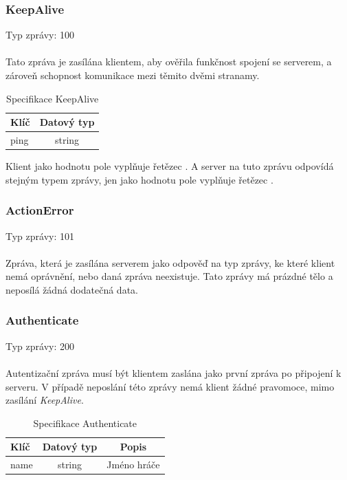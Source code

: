 \documentclass[12pt, a4paper]{article}
\begin{document}
    \subsubsection*{KeepAlive}
    Typ zprávy: 100\\\\
    Tato zpráva je zasílána klientem, aby ověřila funkčnost spojení se serverem, a zároveň schopnost komunikace mezi těmito dvěmi stranamy.

    \begin{table}[H]
        \centering
        \begin{tabular}{|l|c|}
            \hline
            Klíč & Datový typ\\
            \hline
            \hline
            ping & string \\
            \hline
        \end{tabular}
        \caption{Specifikace KeepAlive}
    \end{table}

    Klient jako hodnotu pole  vyplňuje řetězec . A server na tuto zprávu odpovídá stejným typem zprávy, jen jako hodnotu pole  vyplňuje řetězec .

    \subsubsection*{ActionError}
    Typ zprávy: 101\\\\
    Zpráva, která je zasílána serverem jako odpověď na typ zprávy, ke které klient nemá oprávnění, nebo daná zpráva neexistuje.
    Tato zprávy má prázdné tělo a neposílá žádná dodatečná data.

    \subsubsection*{Authenticate}
    Typ zprávy: 200\\\\
    Autentizační zpráva musí být klientem zaslána jako první zpráva po připojení k serveru.
    V případě neposlání této zprávy nemá klient žádné pravomoce, mimo zasílání \textit{KeepAlive}.

    \begin{table}[H]
        \centering
        \begin{tabular}{|l|c|c|}
            \hline
            Klíč & Datový typ & Popis\\
            \hline
            \hline
            name & string & Jméno hráče\\
            \hline
        \end{tabular}
        \caption{Specifikace Authenticate}
    \end{table}
\end{document}
